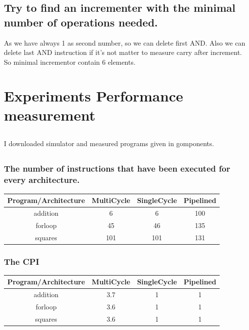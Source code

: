 \documentclass[a4paper,11pt]{article}
\begin{document}
\subsection{Try to find an incrementer with the minimal number of operations needed.}
As we have always 1 as second number, so we can delete first AND. Also we can delete last AND instruction if it's not matter to measure carry after increment. So minimal incrementor contain 6 elements.

\section{Experiments Performance measurement}
\subsection{}
I downloaded simulator and measured programs given in gomponents.

\subsection{}
\subsubsection{The number of instructions that have been executed for every architecture.}
\begin{center}
\begin{tabular}{|c|c|c|c|}
\hline
Program/Architecture & MultiCycle & SingleCycle & Pipelined  \\ \hline \hline 
addition & 6 & 6 & 100  \\ \hline 
forloop & 45 & 46 & 135  \\ \hline 
squares & 101 & 101 & 131  \\ \hline 
\end{tabular}
\end{center}

\subsubsection{The CPI}
\begin{center}
\begin{tabular}{|c|c|c|c|}
\hline
Program/Architecture & MultiCycle & SingleCycle & Pipelined  \\ \hline \hline 
addition & 3.7 & 1 & 1  \\ \hline 
forloop & 3.6 & 1 & 1  \\ \hline 
squares & 3.6 & 1 & 1  \\ \hline 
\end{tabular}
\end{center}
\end{document}
